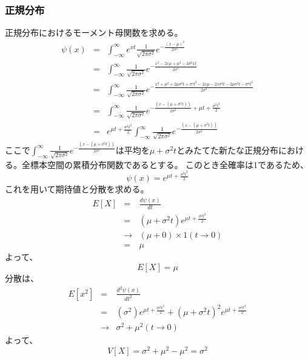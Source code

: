 \documentclass[a4paper,10pt]{jarticle}
\begin{document}
\subsubsection{正規分布}
正規分布におけるモーメント母関数を求める。
\begin{eqnarray*}
    \psi(x) &=& \int_{-\infty}^\infty e^{xt}\frac{1}{\sqrt{2\pi\sigma^2}}e^{-\frac{(x-\mu)^2}{2\sigma^2}}\\
        &=& \int_{-\infty}^\infty \frac{1}{\sqrt{2\pi\sigma^2}}e^{-\frac{x^2-2x\mu+\mu^2-2\sigma^2xt}{2\sigma^2}}\\
        &=& \int_{-\infty}^\infty \frac{1}{\sqrt{2\pi\sigma^2}}e^{-\frac{x^2+\mu^2+2\mu\sigma^2t+\sigma^4t^2-2x\mu-2x\sigma^2t-2\mu\sigma^2t-\sigma^4t^2}{2\sigma^2}}\\
        &=& \int_{-\infty}^\infty \frac{1}{\sqrt{2\pi\sigma^2}}e^{-\frac{(x-(\mu+\sigma^2t))}{2\sigma^2}+\mu t +\frac{\sigma^2t^2}{2}}\\
        &=& e^{\mu t+\frac{\sigma^2t^2}{2}}\int_{-\infty}^\infty \frac{1}{\sqrt{2\pi\sigma^2}}e^{-\frac{(x-(\mu+\sigma^2t))}{2\sigma^2}}
\end{eqnarray*}
ここで$\int_{-\infty}^\infty \frac{1}{\sqrt{2\pi\sigma^2}}e^{-\frac{(x-(\mu+\sigma^2t))}{2\sigma^2}}$は平均を$\mu+\sigma^2t$とみたてた新たな正規分布における。全標本空間の累積分布関数であるとする。
このとき全確率は1であるため、
\begin{equation}
    \psi(x) = e^{\mu t+\frac{\sigma^2t^2}{2}}\tag{3,34}
\end{equation}
これを用いて期待値と分散を求める。
\begin{eqnarray*}
    E[X] &=& \frac{d\psi(x)}{dt}\\
    &=& (\mu+\sigma^2t)e^{\mu t+\frac{\sigma^2t^2}{2}}\\
    &\rightarrow&(\mu+0)\times 1(t\rightarrow 0)\\
    &=& \mu
\end{eqnarray*}
よって、
\begin{equation}
    E[X] = \mu\tag{3,35}
\end{equation}
分散は、
\begin{eqnarray*}
    E[x^2] &=& \frac{d^2\psi(x)}{dt^2}\\
    &=& (\sigma^2)e^{\mu t+\frac{\sigma^2t^2}{2}}+(\mu+\sigma^2t)^2e^{\mu t+\frac{\sigma^2t^2}{2}}\\
    &\rightarrow& \sigma^2+\mu^2(t\rightarrow 0)
\end{eqnarray*}
よって、
\begin{equation}
    V[X] = \sigma^2 + \mu^2 - \mu^2 = \sigma^2 \tag{3,36}
\end{equation}
\end{document}
